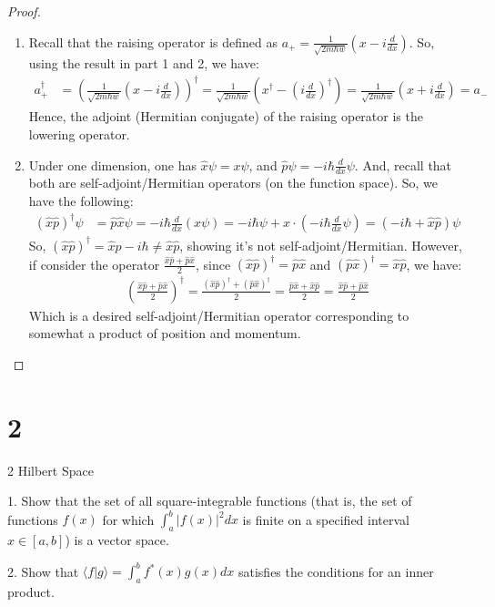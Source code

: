 \documentclass{article}
\begin{document}
\begin{proof}
\begin{enumerate}
        \hfil

        \item Recall that the raising operator is defined as $a_+ = \frac{1}{\sqrt{2m\hbar w}}\left(x-i\frac{d}{dx}\right)$. So, using the result in part 1 and 2, we have:
        \begin{align}
            a_+^\dagger &= \left(\frac{1}{\sqrt{2m\hbar w}}\left(x-i\frac{d}{dx}\right)\right)^\dagger = \frac{1}{\sqrt{2m\hbar w}}\left(x^\dagger - \left(i\frac{d}{dx}\right)^\dagger\right) = \frac{1}{\sqrt{2m\hbar w}}\left(x + i\frac{d}{dx}\right) = a_-
        \end{align}
        Hence, the adjoint (Hermitian conjugate) of the raising operator is the lowering operator.

        \hfil

        \item Under one dimension, one has $\hat{x} \psi = x\psi$, and $\hat{p}\psi = -i\hbar\frac{d}{dx}\psi$. And, recall that both are self-adjoint/Hermitian operators (on the function space). So, we have the following:
        \begin{align}
            (\hat{x}\hat{p})^\dagger\psi &= \hat{p}\hat{x}\psi = -i\hbar\frac{d}{dx}(x\psi) = -i\hbar\psi + x\cdot \left(-i\hbar\frac{d}{dx}\psi\right) = \left(-i\hbar + \hat{x}\hat{p}\right)\psi
        \end{align}
        So, $(\hat{x}\hat{p})^\dagger = \hat{x}\hat{p} - i\hbar \neq \hat{x}\hat{p}$, showing it's not self-adjoint/Hermitian. However, if consider the operator $\frac{\hat{x}\hat{p}+\hat{p}\hat{x}}{2}$, since $(\hat{x}\hat{p})^\dagger = \hat{p}\hat{x}$ and $(\hat{p}\hat{x})^\dagger = \hat{x}\hat{p}$, we have:
        \begin{align}
            \left(\frac{\hat{x}\hat{p}+\hat{p}\hat{x}}{2}\right)^\dagger = \frac{(\hat{x}\hat{p})^\dagger+(\hat{p}\hat{x})^\dagger}{2}=\frac{\hat{p}\hat{x}+\hat{x}\hat{p}}{2}=\frac{\hat{x}\hat{p}+\hat{p}\hat{x}}{2}
        \end{align}
        Which is a desired self-adjoint/Hermitian operator corresponding to somewhat a product of position and momentum.
    \end{enumerate}
\end{proof}

\newpage

\section*{2}
\begin{ques}\label{q2}
2 Hilbert Space

1. Show that the set of all square-integrable functions (that is, the set of functions $f(x)$ for which $\int_a^b |f(x)|^2 dx$ is finite on a specified interval $x\in[a,b]$) is a vector space.

2. Show that $\langle f|g\rangle = \int_a^b f^\ast(x) g(x) dx$ satisfies the conditions for an inner product.
\end{ques}
\end{document}
